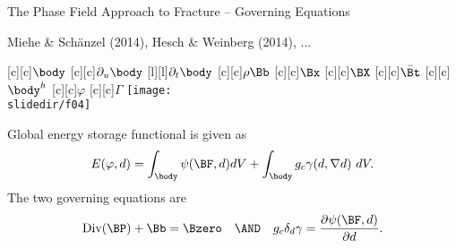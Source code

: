 

\begin{frame}{The Phase Field Approach to Fracture -- Governing Equations}

\begin{reference}{}{}
Miehe \& Sch\"anzel (2014), Hesch \& Weinberg (2014), ...
\end{reference}

\vspace{-3mm}

\begin{center}
{\footnotesize
  [c][c]{$\body$}
  [c][c]{$\partial_u\body$}
  [l][l]{$\partial_t\body$}
  [c][c]{$\rho\Bb$}
  [c][c]{$\Bx$}
  [c][c]{$\BX$}
  [c][c]{$\bar\Bt$}
  [c][c]{$\body^h$}
  [c][c]{$\varphi$}
  [c][c]{$\Gamma$}
\texttt{[image: \\slidedir/f04]}
}

\end{center}

\bigskip


Global energy storage functional is given as
\begin{equation*}
  E(\varphi,d)=\int_{\body} \psi(\BF,d) dV  + \int_{\body}g_c \gamma(d,\nabla d)~dV.  %
\end{equation*}
The two governing equations are
\begin{equation*}
  \text{Div} (\BP) + \Bb =\Bzero \quad\AND\quad  g_c\delta_d\gamma=\frac{\partial \psi(\BF,d)}{\partial d}.
\end{equation*}

\end{frame}

